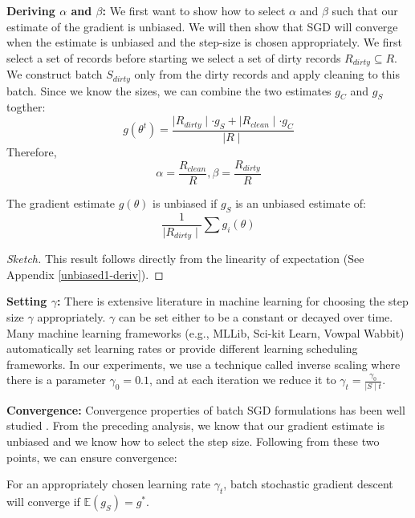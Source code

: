 \vspace{0.25em}

\noindent\textbf{Deriving $\alpha$ and $\beta$: } We first want to show how to select $\alpha$ and $\beta$ such that our estimate of the gradient is unbiased. 
We will then show that SGD will converge when the estimate is unbiased and the step-size is chosen appropriately.
We first select a set of records before starting we select a set of dirty records $R_{dirty} \subseteq R$. 
We construct batch $S_{dirty}$ only from the dirty records and apply cleaning to this batch.
Since we know the sizes, we can combine the two estimates $g_C$ and $g_S$ togther:
\[
g(\theta^{t}) = \frac{\mid R_{dirty} \mid \cdot g_S + \mid R_{clean} \mid \cdot g_C  }{\mid R \mid}
\]
Therefore,
\[
\alpha = \frac{R_{clean}}{R}, \beta = \frac{R_{dirty}}{R}
\]

\begin{lemma}\label{unbiased1}
The gradient estimate $g(\theta)$ is unbiased if $g_S$ is an unbiased estimate of:
\[
\frac{1}{\mid R_{dirty} \mid} \sum g_i(\theta)
\]
\end{lemma}
\begin{proof}[Sketch]
This result follows directly from the linearity of expectation (See Appendix \ref{unbiased1-deriv}).
\end{proof}

\vspace{0.25em}

\noindent\textbf{ Setting $\gamma$: } There is extensive literature in machine learning for choosing the step size $\gamma$ appropriately. $\gamma$ can be set either to be a constant or decayed over time. Many machine learning frameworks (e.g., MLLib, Sci-kit Learn, Vowpal Wabbit) automatically set learning rates or provide different learning scheduling frameworks. 
In our experiments, we use a technique called inverse scaling where there is a parameter $\gamma_0=0.1$, and at each iteration we reduce it to $\gamma_t = \frac{\gamma_0}{\mid S \mid t}$. 

\vspace{0.25em}

\noindent\textbf{ Convergence: } Convergence properties of batch SGD formulations has been well studied \cite{dekel2012optimal}. From the preceding analysis, we know that our gradient estimate is unbiased and we know how to select the step size. Following from these two points, we can ensure convergence: 

\begin{proposition}
For an appropriately chosen learning rate $\gamma_t$, batch stochastic gradient descent will converge if $\mathbb{E}(g_S)=g^*$.
\label{unbiased}
\end{proposition}

